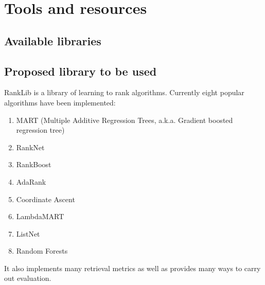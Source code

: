 \documentclass[]{article}
\begin{document}
\section{Tools and resources}
\subsection{Available libraries}
\subsection{Proposed library to be used}
RankLib is a library of learning to rank algorithms. Currently eight popular algorithms have been implemented:
\begin{enumerate}
\item MART (Multiple Additive Regression Trees, a.k.a. Gradient boosted regression tree)\cite{16}
\item RankNet\cite{17}
\item RankBoost\cite{18}
\item AdaRank\cite{19}
\item Coordinate Ascent\cite{20}
\item LambdaMART\cite{21}
\item ListNet\cite{22}
\item Random Forests\cite{23}

\end{enumerate}

It also implements many retrieval metrics as well as provides many ways to carry out evaluation.
\end{document}

